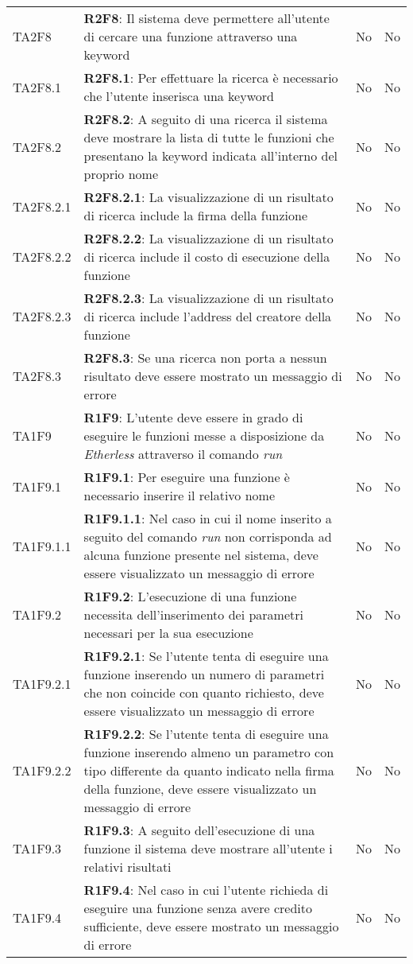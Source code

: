 \begin{longtable}{ 
		>{\centering}p{} 
		>{}p{} 
		>{\centering}p{}
		>{\centering}p{} }
	TA2F8 & \textbf{R2F8}: Il sistema deve permettere all'utente di cercare una funzione 
		attraverso una keyword 														& No & No \tabularnewline
	TA2F8.1 & \textbf{R2F8.1}: Per effettuare la ricerca è necessario che l'utente inserisca 
		una keyword 																& No & No \tabularnewline
	TA2F8.2 & \textbf{R2F8.2}: A seguito di una ricerca il sistema deve mostrare la lista di
	 tutte le funzioni che presentano la keyword indicata 
	 all'interno del proprio nome													& No & No \tabularnewline
	TA2F8.2.1 & \textbf{R2F8.2.1}: La visualizzazione di un risultato di ricerca include
		 la firma della funzione													& No & No \tabularnewline
  	TA2F8.2.2 & \textbf{R2F8.2.2}: La visualizzazione di un risultato di ricerca include
		  il costo di esecuzione della funzione										& No & No \tabularnewline
  	TA2F8.2.3 & \textbf{R2F8.2.3}: La visualizzazione di un risultato di ricerca include
		  l'address del creatore della funzione									& No & No \tabularnewline
	TA2F8.3 & \textbf{R2F8.3}: Se una ricerca non porta a nessun risultato deve essere mostrato un 
		messaggio di errore 														& No & No \tabularnewline	
	
	TA1F9 & \textbf{R1F9}: L'utente deve essere in grado di eseguire le funzioni messe a 
		disposizione da \textit{Etherless} attraverso il comando \textit{run} 				& No & No \tabularnewline
	TA1F9.1 & \textbf{R1F9.1}: Per eseguire una funzione è necessario inserire il relativo nome 		& No & No \tabularnewline
	TA1F9.1.1 & \textbf{R1F9.1.1}: Nel caso in cui il nome inserito a seguito del comando \textit{run} non 
		corrisponda ad alcuna funzione presente nel sistema, deve essere 
		visualizzato un messaggio di errore											& No & No \tabularnewline 
	TA1F9.2 & \textbf{R1F9.2}: L'esecuzione di una funzione necessita dell'inserimento dei parametri necessari per la sua esecuzione 															& No & No \tabularnewline
	TA1F9.2.1 & \textbf{R1F9.2.1}: Se l'utente tenta di eseguire una funzione inserendo un numero 
		di parametri che non coincide con quanto richiesto, deve essere 
		visualizzato un messaggio di errore 										& No & No \tabularnewline
	TA1F9.2.2 & \textbf{R1F9.2.2}: Se l'utente tenta di eseguire una funzione inserendo almeno un parametro	con tipo differente da 
		quanto indicato nella firma della funzione, deve essere visualizzato
		un messaggio di errore 										& No & No \tabularnewline
	TA1F9.3 & \textbf{R1F9.3}: A seguito dell'esecuzione di una funzione il sistema deve mostrare 
		all'utente i relativi risultati 											& No & No \tabularnewline
	TA1F9.4 & \textbf{R1F9.4}: Nel caso in cui l'utente richieda di eseguire una funzione senza 
		avere credito sufficiente, deve essere mostrato un messaggio di errore		& No & No \tabularnewline
	

\end{longtable}
